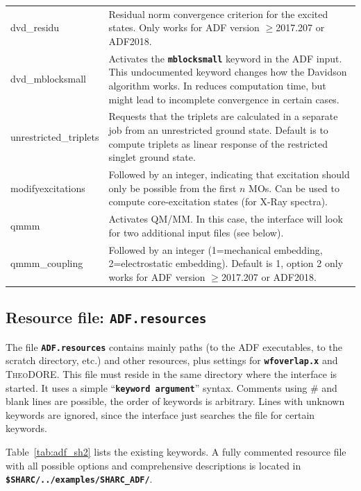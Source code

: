 \documentclass[a4paper,10pt,DIV=15,openany,twoside=false]{scrbook}
\newcommand{\ttt}[1]{\textbf{\texttt{#1}}}
\begin{document}
\begin{table}
\begin{tabular}{>{\ttfamily}lp{12cm}}
\\
dvd\_residu             &Residual norm convergence criterion for the excited states. Only works for ADF version $\geq$2017.207 or ADF2018.
\\
dvd\_mblocksmall        &Activates the \ttt{mblocksmall} keyword in the ADF input. This undocumented keyword changes how the Davidson algorithm works. In reduces computation time, but might lead to incomplete convergence in certain cases.
\\
unrestricted\_triplets  &Requests that the triplets are calculated in a separate job from an unrestricted ground state. Default is to compute triplets as linear response of the restricted singlet ground state.
\\
modifyexcitations       &Followed by an integer, indicating that excitation should only be possible from the first $n$ MOs. Can be used to compute core-excitation states (for X-Ray spectra).
\\
qmmm                    &Activates QM/MM. In this case, the interface will look for two additional input files (see below).
\\
qmmm\_coupling          &Followed by an integer (1=mechanical embedding, 2=electrostatic embedding). Default is 1, option 2 only works for ADF version $\geq$2017.207 or ADF2018.\\
  \bottomrule
  \end{tabular}
\end{table}

\subsection{Resource file: \ttt{ADF.resources}}

The file \ttt{ADF.resources} contains mainly paths (to the \textsc{ADF} executables, to the scratch directory, etc.) and other resources, plus settings for \ttt{wfoverlap.x} and \textsc{TheoDORE}. This file must reside in the same directory where the interface is started. It uses a simple ``\ttt{keyword argument}'' syntax. Comments using \# and blank lines are possible, the order of keywords is arbitrary. Lines with unknown keywords are ignored, since the interface just searches the file for certain keywords.

Table~\ref{tab:adf_sh2} lists the existing keywords.
A fully commented resource file with all possible options and comprehensive descriptions is located in \ttt{\$SHARC/../examples/SHARC\_ADF/}.
\end{document}
